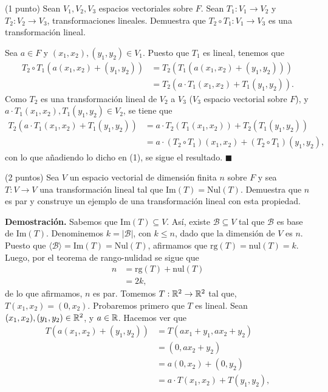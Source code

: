 \documentclass[11pt]{scrartcl}
\begin{document}
\begin{mdframed}[style=mdpurplebox, frametitle={Ejercicio 4, Tarea 09, Álgebra Lineal I}]
    (1 punto) Sean $V_1,V_2,V_3$ espacios vectoriales sobre $F$. Sean $T_1:V_1\rightarrow V_2$ y $T_2:V_2\rightarrow V_3$,
    transformaciones lineales. Demuestra que $T_2\circ T_1:V_1 \rightarrow V_3$ es una transformación lineal.
\end{mdframed}
Sea $a \in F$ y $(x_1,x_2),(y_1,y_2) \in V_1$. Puesto que $T_1$ es lineal, tenemos que
\begin{align*}
    T_2 \circ T_1 (a(x_1,x_2)+(y_1,y_2)) &= T_2(T_1(a(x_1,x_2)+(y_1,y_2))) \\
    &= T_2(a\cdot T_1(x_1,x_2)+T_1(y_1,y_2)). \tag{1}
\end{align*}
Como $T_2$ es una transformación lineal de $V_2$ a $V_3$ ($V_3$ espacio vectorial sobre $F$), y $a\cdot T_1(x_1,x_2),T_1(y_1,y_2) \in V_2$,
se tiene que
\begin{align*}
    T_2(a\cdot T_1(x_1,x_2)+T_1(y_1,y_2)) &= a\cdot T_2(T_1(x_1,x_2))+T_2(T_1(y_1,y_2)) \\
    &= a\cdot (T_2 \circ T_1)(x_1,x_2) + (T_2 \circ T_1)(y_1,y_2),
\end{align*}
con lo que añadiendo lo dicho en (1), se sigue el resultado. $\blacksquare$
\newpage
\begin{mdframed}[style=mdpurplebox, frametitle={Ejercicio 5, Tarea 09, Álgebra Lineal I}]
    (2 puntos) Sea $V$ un espacio vectorial de dimensión finita $n$ sobre $F$ y sea $T:V\rightarrow V$ una transformación lineal
    tal que $\text{Im}(T)=\text{Nul}(T)$. Demuestra que $n$ es par y construye un ejemplo de una transformación lineal con esta propiedad.
\end{mdframed}
\textbf{Demostración.} Sabemos que $\text{Im}(T)\subseteq V$. Así, existe $\mathcal{B}\subseteq V$ tal que $\mathcal{B}$ es base de $\text{Im}(T)$.
Denominemos $k=|\mathcal{B}|$, con $k \leq n$, dado que la dimensión de $V$ es $n$. Puesto que $\langle\mathcal{B}\rangle=\text{Im}(T)=\text{Nul}(T)$,
afirmamos que $\text{rg}(T)=\text{nul}(T)=k$. Luego, por el teorema de rango-nulidad se sigue que
\begin{align*}
    n &= \text{rg}(T) + \text{nul}(T) \\
    &= 2k,
\end{align*}
de lo que afirmamos, $n$ es par. Tomemos $T:\mathbb R^2\rightarrow \mathbb R^2$ tal que, $T(x_1,x_2)=(0,x_2)$. Probaremos primero que $T$ es lineal. Sean $(x_1,x_2),(y_1,y_2) \in \mathbb R^2$,
y $a \in \mathbb R$. Hacemos ver que
\begin{align*}
    T(a(x_1,x_2)+(y_1,y_2)) &= T(ax_1+y_1,ax_2+y_2) \\
    &= (0,ax_2+y_2) \\
    &= a(0,x_2)+(0,y_2) \\
    &=a\cdot T(x_1,x_2) + T(y_1,y_2),
\end{align*}
\end{document}
